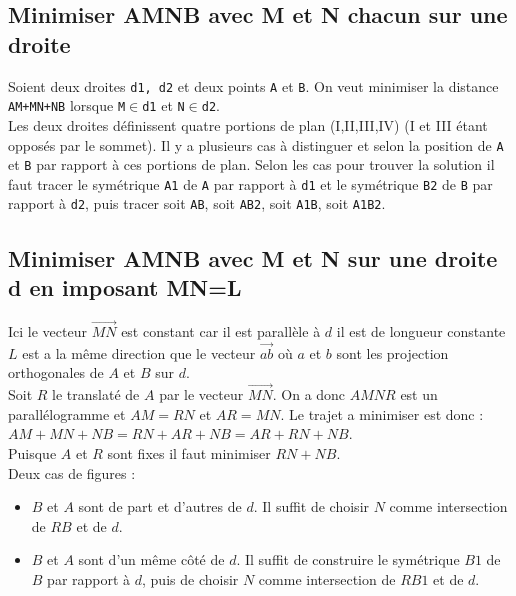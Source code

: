 \documentclass[a4paper,11pt]{book}
\begin{document}
\subsection{Minimiser AMNB avec M et N chacun sur une droite}
Soient deux droites {\tt d1, d2} et deux points {\tt A} et {\tt B}. On veut 
minimiser la distance {\tt AM+MN+NB} lorsque {\tt M}$\in${\tt d1} et 
{\tt N}$\in${\tt d2}.\\
Les deux droites d\'efinissent quatre portions de plan (I,II,III,IV) 
(I et III \'etant oppos\'es par le sommet). 
Il y a plusieurs cas \`a distinguer et selon la position de {\tt A} et {\tt B}
par rapport \`a ces portions de plan. Selon les cas pour trouver la solution 
il faut tracer  le sym\'etrique {\tt A1} de {\tt A} par
rapport \`a {\tt d1} et le sym\'etrique {\tt B2} de {\tt B} par
rapport \`a {\tt d2}, puis tracer soit {\tt AB}, soit {\tt AB2},
soit {\tt A1B}, soit {\tt A1B2}. 
\subsection{Minimiser AMNB avec M et N sur une droite d en imposant MN=L}
Ici le vecteur $\overrightarrow{MN}$ est constant car il est parall\`ele \`a
$d$ il est de longueur constante $L$ est a la m\^eme direction que le vecteur 
$\overrightarrow{ab}$ o\`u $a$ et $b$ sont les projection orthogonales de $A$ 
et $B$ sur $d$.\\
Soit $R$ le translat\'e de $A$ par le vecteur $\overrightarrow{MN}$. On a donc 
$AMNR$ est un parall\'elogramme et $AM=RN$ et $AR=MN$.
Le trajet a minimiser est donc : $AM+MN+NB=RN+AR+NB=AR+RN+NB$.\\
Puisque $A$ et $R$ sont fixes il faut minimiser $RN+NB$.\\
Deux cas de figures :
\begin{itemize}
\item $B$ et $A$ sont de part et d'autres de $d$. Il suffit de choisir $N$ 
comme intersection de $RB$ et de $d$.
\item  $B$ et $A$ sont d'un m\^eme c\^ot\'e de $d$. Il suffit de construire le
sym\'etrique $B1$ de $B$ par rapport \`a $d$, puis de choisir $N$ 
comme intersection de $RB1$ et de $d$.
\end{itemize}
\end{document}
